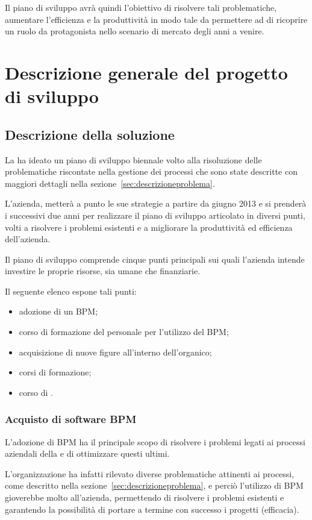 Il piano di sviluppo avrà quindi l'obiettivo di risolvere tali problematiche, aumentare l'efficienza e la produttività in modo tale da permettere ad \customer di ricoprire un ruolo da protagonista nello scenario di mercato degli anni a venire.

\chapter{Descrizione generale del progetto di sviluppo}

\section{Descrizione della soluzione}
La \customer ha ideato un piano di sviluppo biennale volto alla risoluzione delle problematiche riscontate nella gestione dei processi che sono state descritte con maggiori dettagli nella sezione~\ref{sec:descrizioneproblema}.

L'azienda, metterà a punto le sue strategie a partire da giugno 2013 e si prenderà i successivi due anni per realizzare il piano di sviluppo articolato in diversi punti, volti a risolvere i problemi esistenti e a migliorare la produttività ed efficienza dell'azienda.
		
Il piano di sviluppo comprende cinque punti principali sui quali l'azienda intende investire le proprie risorse, sia umane che finanziarie. 

Il seguente elenco espone tali punti:
	\begin{itemize}
  		\item adozione di un \sw BPM;
       \item corso di formazione del personale per l'utilizzo del \sw BPM;
       \item acquisizione di nuove figure all'interno dell'organico;
       \item corsi di formazione;
        \item corso di .
     \end{itemize}
	
\subsection{Acquisto di software BPM}
 L'adozione di  BPM ha il principale scopo di risolvere i problemi legati ai processi aziendali della \customer e di ottimizzare questi ultimi.
 
L'organizzazione ha infatti rilevato diverse problematiche attinenti ai processi, come descritto nella sezione~\ref{sec:descrizioneproblema}, e perciò l'utilizzo di \sw BPM gioverebbe molto all'azienda, permettendo di risolvere i problemi esistenti e garantendo la possibilità di portare a termine con successo i progetti (efficacia).
 
